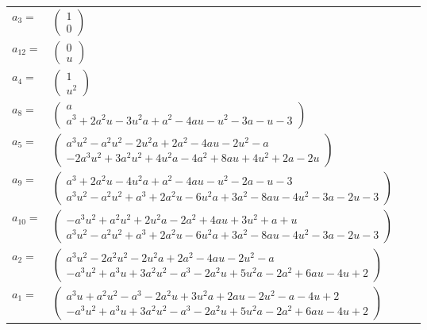 \documentclass[1p]{elsarticle_modified}
\theoremstyle{definition}
\begin{document}
\begin{tabular}{m{7pt} m{180pt} m{7pt} m{180pt} }
\flushright $a_{3}=$&$\begin{pmatrix}1\\0\end{pmatrix}$ \\
\flushright $a_{12}=$&$\begin{pmatrix}0\\u\end{pmatrix}$ \\
\flushright $a_{4}=$&$\begin{pmatrix}1\\u^2\end{pmatrix}$ \\
\flushright $a_{8}=$&$\begin{pmatrix}a\\a^3+2 a^2 u-3 u^2 a+a^2-4 a u- u^2-3 a- u-3\end{pmatrix}$ \\
\flushright $a_{5}=$&$\begin{pmatrix}a^3 u^2- a^2 u^2-2 u^2 a+2 a^2-4 a u-2 u^2- a\\-2 a^3 u^2+3 a^2 u^2+4 u^2 a-4 a^2+8 a u+4 u^2+2 a-2 u\end{pmatrix}$ \\
\flushright $a_{9}=$&$\begin{pmatrix}a^3+2 a^2 u-4 u^2 a+a^2-4 a u- u^2-2 a- u-3\\a^3 u^2- a^2 u^2+a^3+2 a^2 u-6 u^2 a+3 a^2-8 a u-4 u^2-3 a-2 u-3\end{pmatrix}$ \\
\flushright $a_{10}=$&$\begin{pmatrix}- a^3 u^2+a^2 u^2+2 u^2 a-2 a^2+4 a u+3 u^2+a+u\\a^3 u^2- a^2 u^2+a^3+2 a^2 u-6 u^2 a+3 a^2-8 a u-4 u^2-3 a-2 u-3\end{pmatrix}$ \\
\flushright $a_{2}=$&$\begin{pmatrix}a^3 u^2-2 a^2 u^2-2 u^2 a+2 a^2-4 a u-2 u^2- a\\- a^3 u^2+a^3 u+3 a^2 u^2- a^3-2 a^2 u+5 u^2 a-2 a^2+6 a u-4 u+2\end{pmatrix}$ \\
\flushright $a_{1}=$&$\begin{pmatrix}a^3 u+a^2 u^2- a^3-2 a^2 u+3 u^2 a+2 a u-2 u^2- a-4 u+2\\- a^3 u^2+a^3 u+3 a^2 u^2- a^3-2 a^2 u+5 u^2 a-2 a^2+6 a u-4 u+2\end{pmatrix}$ \\

\end{tabular}
\end{document}
